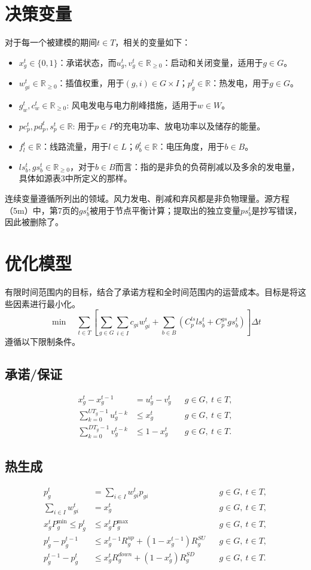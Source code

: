 \documentclass[11pt,a4paper]{article}
\begin{document}
\section{决策变量}
对于每一个被建模的期间$t\in T$，相关的变量如下：
\begin{itemize}
\item $x_g^t\in\{0,1\}$：承诺状态，而$u_g^t,v_g^t\in\mathbb R_{\geq0}$：启动和关闭变量，适用于$g\in G$。
\item $w_{gi}^t\in\mathbb R_{\geq0}$：插值权重，用于$(g,i)\in G\times I$；$p_g^t\in\mathbb R$：热发电，用于$g\in G$。
\item $g_w^t,c_w^t\in\mathbb R_{\geq0}$: 风电发电与电力削峰措施，适用于$w\in W$。
\item $pc_p^t,pd_p^t,s_p^t\in\mathbb R$: 用于$p\in P$的充电功率、放电功率以及储存的能量。
\item $f_l^t\in\mathbb R$：线路流量，用于$l\in L$；$\theta_b^t\in\mathbb R$：电压角度，用于$b\in B$。
\item $ls_b^t,gs_b^t\in\mathbb R_{\geq0}$，对于$b\in B$而言：指的是非负的负荷削减以及多余的发电量，具体如源表3中所定义的那样。
\end{itemize}
连续变量遵循所列出的领域。风力发电、削减和弃风都是非负物理量。源方程（5m）中，第7页的$gs_b^t$被用于节点平衡计算；提取出的独立变量$ps_b^t$是抄写错误，因此被删除了。

\section{优化模型}
有限时间范围内的目标，结合了承诺方程和全时间范围内的运营成本。目标是将这些因素进行最小化。
\begin{equation}
\min\quad
\sum_{t\in T}\left[
\sum_{g\in G}\sum_{i\in I}c_{gi}w_{gi}^t
+\sum_{b\in B}\left(C_p^{ls}ls_b^t+C_p^{gs}gs_b^t\right)
\right]\Delta t
\end{equation}
遵循以下限制条件。

\subsection*{承诺/保证}
\begin{align}
x_g^t-x_g^{t-1}&=u_g^t-v_g^t
&&g\in G,\ t\in T,\\
\sum_{k=0}^{UT_g-1}u_g^{t-k}&\leq x_g^t
&&g\in G,\ t\in T,\\
\sum_{k=0}^{DT_g-1}v_g^{t-k}&\leq1-x_g^t
&&g\in G,\ t\in T.
\end{align}

\subsection*{热生成}
\begin{align}
p_g^t&=\sum_{i\in I}w_{gi}^t p_{gi}
&&g\in G,\ t\in T,\\
\sum_{i\in I}w_{gi}^t&=x_g^t
&&g\in G,\ t\in T,\\
x_g^tP_g^{\min}\leq p_g^t&\leq x_g^tP_g^{\max}
&&g\in G,\ t\in T,\\
p_g^t-p_g^{t-1}&\leq x_g^{t-1}R_g^{up}+(1-x_g^{t-1})R_g^{SU}
&&g\in G,\ t\in T,\\
p_g^{t-1}-p_g^t&\leq x_g^tR_g^{down}+(1-x_g^t)R_g^{SD}
&&g\in G,\ t\in T.
\end{align}
\end{document}
